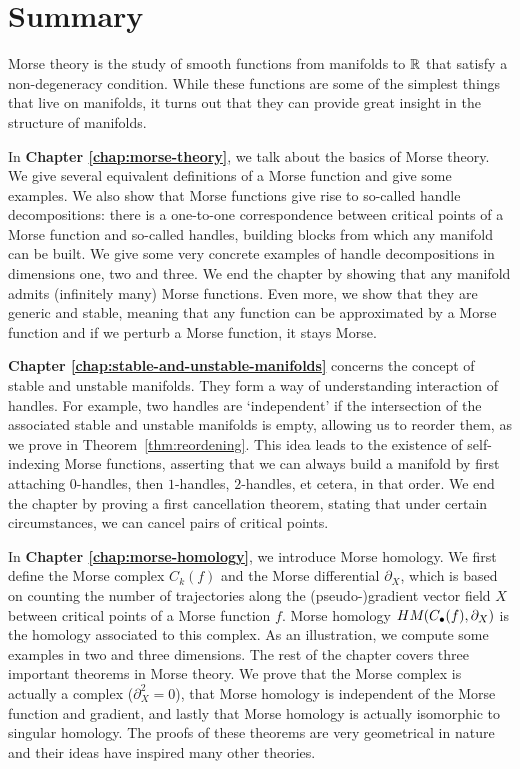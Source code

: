 \chapter*{Summary}
\label{ch:summary}

Morse theory is the study of smooth functions from manifolds to $\mathbb{R}$ that satisfy a non-degeneracy condition. While these functions are some of the simplest things that live on manifolds, it turns out that they can provide great insight in the structure of manifolds.

\bigskip
In \textbf{Chapter \ref{chap:morse-theory}}, we talk about the basics of Morse theory.
We give several equivalent definitions of a Morse function and give some examples.
We also show that Morse functions give rise to so-called handle decompositions: there is a one-to-one correspondence between critical points of a Morse function and so-called handles, building blocks from which any manifold can be built.
We give some very concrete examples of handle decompositions in dimensions one, two and three.
We end the chapter by showing that any manifold admits (infinitely many) Morse functions.
Even more, we show that they are generic and stable, meaning that any function can be approximated by a Morse function and if we perturb a Morse function, it stays Morse.

\bigskip

\textbf{Chapter \ref{chap:stable-and-unstable-manifolds}} concerns the concept of stable and unstable manifolds.
They form a way of understanding interaction of handles.
For example, two handles are `independent' if the intersection of the associated stable and unstable manifolds is empty, allowing us to reorder them, as we prove in Theorem~\ref{thm:reordening}.
This idea leads to the existence of self-indexing Morse functions, asserting that we can always build a manifold by first attaching $0$-handles, then $1$-handles, $2$-handles, et cetera, in that order.
We end the chapter by proving a first cancellation theorem, stating that under certain circumstances, we can cancel pairs of critical points.

\bigskip
In \textbf{Chapter \ref{chap:morse-homology}}, we introduce Morse homology.
We first define the Morse complex $C_k(f)$ and the Morse differential $\partial_X$, which is based on counting the number of trajectories along the (pseudo-)gradient vector field $X$ between critical points of a Morse function $f$.
Morse homology $HM_{}(C_\bullet(f), \partial_X)$ is the homology associated to this complex.
As an illustration, we compute some examples in two and three dimensions.
The rest of the chapter covers three important theorems in Morse theory.
We prove that the Morse complex is actually a complex ($\partial_X^2 = 0$), that Morse homology is independent of the Morse function and gradient, and lastly that Morse homology is actually isomorphic to singular homology.
The proofs of these theorems are very geometrical in nature and their ideas have inspired many other theories.

